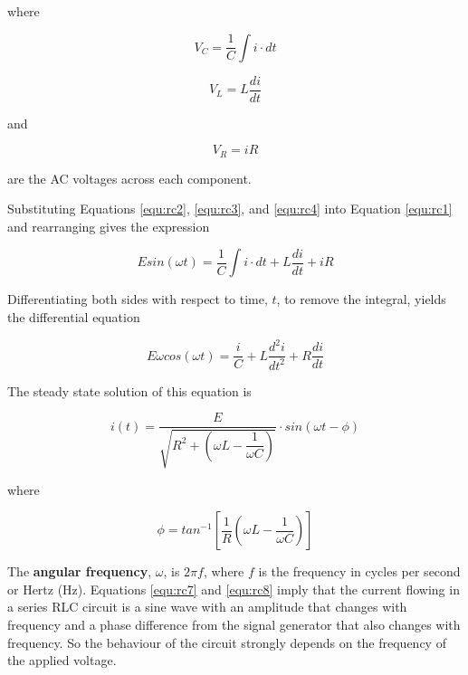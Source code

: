 \noindent where

\begin{equation}
V_C=\dfrac{1}{C}\int i\cdot dt
\label{equ:rc2}
\end{equation}

\begin{equation}
V_L=L\dfrac{di}{dt}
\label{equ:rc3}
\end{equation}

\noindent and

\begin{equation}
V_R=iR
\label{equ:rc4}
\end{equation}

\noindent are the AC voltages across each component.

Substituting Equations \ref{equ:rc2}, \ref{equ:rc3}, and \ref{equ:rc4} into Equation \ref{equ:rc1} and rearranging gives the expression

\begin{equation}
Esin(\omega t)=\dfrac{1}{C}\int i\cdot dt +L\dfrac{di}{dt}+iR
\label{equ:rc5}
\end{equation}

Differentiating both sides with respect to time, $t$, to remove the integral, yields the differential equation


\begin{equation}
E\omega cos(\omega t)=\dfrac{i}{C}+L\dfrac{d^2i}{dt^2}+R\dfrac{di}{dt}
\label{equ:rc6}
\end{equation}

\noindent The steady state solution of this equation is


\begin{equation}
i(t)=\dfrac{E}{\sqrt{R^2+\left(\omega L-\dfrac{1}{\omega C}\right)}}\cdot sin(\omega t-\phi)
\label{equ:rc7}
\end{equation}

\noindent where


\begin{equation}
\phi=tan^{-1}\left[\dfrac{1}{R}\left(\omega L-\dfrac{1}{\omega C}\right)\right]
\label{equ:rc8}
\end{equation}

The {\bf angular frequency}, $\omega$, is $2\pi f$, where $f$ is the frequency in cycles per second or Hertz (Hz). Equations \ref{equ:rc7} and \ref{equ:rc8} imply that the current flowing in a series RLC circuit is a sine wave with an amplitude that changes with frequency and a phase difference from the signal generator that also changes with frequency. So the behaviour of the circuit strongly depends on the frequency of the applied voltage.

